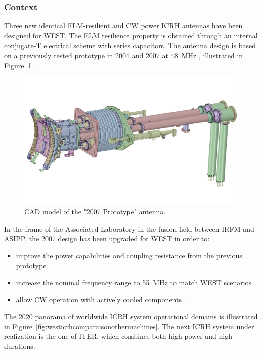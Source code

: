 \subsubsection{Context}
Three new identical ELM-resilient and CW power ICRH antennas have been designed for WEST. The ELM resilience property is obtained through an internal conjugate-T electrical scheme with series capacitors. The antenna design is based on a previously tested prototype in 2004 and 2007 at 48~MHz , illustrated in Figure~\ref{fig:proto2007antenna}. 

\begin{figure}[h]
	\centering
	\includegraphics[width=1.0\linewidth]{figures/chap3/WEST_ICRH/proto2007_antenna}
	\caption{CAD model of the "2007 Prototype" antenna.}
	\label{fig:proto2007antenna}
\end{figure}

In the frame of the Associated Laboratory in the fusion field between IRFM and ASIPP, the 2007 design has been upgraded for WEST in order to: 
\begin{itemize}
	\item improve the power capabilities and coupling resistance from the previous prototype   
	\item increase the nominal frequency range to 55~MHz to match WEST scenarios
	\item allow CW operation with actively cooled components .
\end{itemize} 

The 2020 panorama of worldwide ICRH system operational domains is illustrated in Figure~\ref{fig:westicrhcomparaisonothermachines}. The next ICRH system under realization is the one of ITER, which combines both high power and high durations. 

